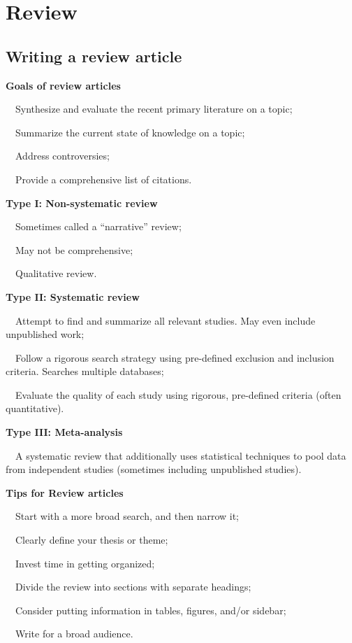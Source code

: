\documentclass[a4paper, 12pt]{article}
\begin{document}
\newpage\section{Review}

\subsection{Writing a review article}

\textbf{Goals of review articles}
\par\ \textbullet\ Synthesize and evaluate the recent primary literature on a topic;
\par\ \textbullet\ Summarize the current state of knowledge on a topic;
\par\ \textbullet\ Address controversies;
\par\ \textbullet\ Provide a comprehensive list of citations.

\textbf{Type I: Non-systematic review}
\par\ \textbullet\ Sometimes called a ``narrative'' review;
\par\ \textbullet\ May not be comprehensive;
\par\ \textbullet\ Qualitative review.

\textbf{Type II: Systematic review}
\par\ \textbullet\ Attempt to find and summarize all relevant studies. May even include unpublished work;
\par\ \textbullet\ Follow a rigorous search strategy using pre-defined exclusion and inclusion criteria. Searches multiple databases;
\par\ \textbullet\ Evaluate the quality of each study using rigorous, pre-defined criteria (often quantitative).

\textbf{Type III: Meta-analysis}
\par\ \textbullet\ A systematic review that additionally uses statistical techniques to pool data from independent studies (sometimes including unpublished studies).

\textbf{Tips for Review articles}
\par\ \textbullet\ Start with a more broad search, and then narrow it;
\par\ \textbullet\ Clearly define your thesis or theme;
\par\ \textbullet\ Invest time in getting organized;
\par\ \textbullet\ Divide the review into sections with separate headings;
\par\ \textbullet\ Consider putting information in tables, figures, and/or sidebar;
\par\ \textbullet\ Write for a broad audience.
\end{document}
